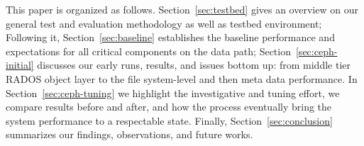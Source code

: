 This paper is organized as follows. Section~\ref{sec:testbed} gives an
overview on our general test and evaluation methodology as well as testbed
environment; Following it, Section~\ref{sec:baseline} establishes the baseline
performance and expectations for all critical components on the data path;
Section~\ref{sec:ceph-initial} discusses our early runs, results, and issues
bottom up: from middle tier RADOS object layer to the file system-level and
then meta data performance. In Section~\ref{sec:ceph-tuning} we highlight the
investigative and tuning effort, we compare results before and after, and how
the process eventually bring the system performance to a respectable state.
Finally, Section~\ref{sec:conclusion} summarizes our findings, observations,
and future works.
